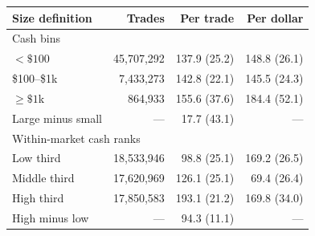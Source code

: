 \begin{tabular}{lrrr}
\toprule
Size definition & Trades & Per trade & Per dollar \\
\midrule
\multicolumn{4}{l}{Cash bins} \\
$<\$100$ & 45,707,292 & 137.9 (25.2) & 148.8 (26.1) \\
\$100--\$1k & 7,433,273 & 142.8 (22.1) & 145.5 (24.3) \\
$\ge\$1$k & 864,933 & 155.6 (37.6) & 184.4 (52.1) \\
Large minus small & --- & 17.7 (43.1) & --- \\
\midrule
\multicolumn{4}{l}{Within-market cash ranks} \\
Low third & 18,533,946 & 98.8 (25.1) & 169.2 (26.5) \\
Middle third & 17,620,969 & 126.1 (25.1) & 69.4 (26.4) \\
High third & 17,850,583 & 193.1 (21.2) & 169.8 (34.0) \\
High minus low & --- & 94.3 (11.1) & --- \\
\bottomrule
\end{tabular}
